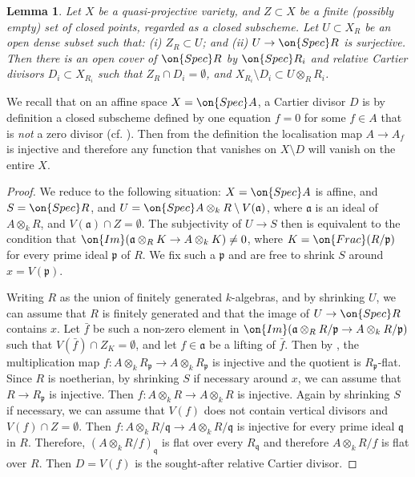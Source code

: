 \documentclass[]{pcmi}
\theoremstyle{plain}
\newtheorem{lem}[equation]{Lemma}
\theoremstyle{remark}
\theoremstyle{definition}
\newcommand{\fraka}{{\mathfrak a}}
\newcommand{\frakp}{{\mathfrak p}}
\newcommand{\frakq}{{\mathfrak q}}
\newcommand{\Spec}{\on{Spec}}
\begin{document}
\begin{lem}\label{very dense vs Cartier}
Let $X$ be a quasi-projective variety, and $Z\subset X$ be a finite (possibly empty) set of closed points, regarded as a closed subscheme.
Let $U\subset X_R$ be an open dense subset such that: (i) $Z_R\subset U$; and (ii) $U\to \Spec R$ is surjective. Then there is an open cover of $\Spec R$ by $\Spec R_i$ and relative Cartier divisors $D_i\subset X_{R_i}$ such that $Z_R\cap D_i=\emptyset$, and $X_{R_i}\setminus D_i\subset U\otimes_RR_i$. 
\end{lem}
We recall that on an affine space $X=\Spec A$, a Cartier divisor $D$ is by definition a closed subscheme defined by one equation $f=0$ for some $f\in A$ that is \emph{not} a zero divisor (cf. \cite[Tag01WQ]{St}). Then from the definition the localisation map $A\to A_f$ is injective and therefore any function that vanishes on $X\setminus D$ will vanish on the entire $X$.
\begin{proof}We reduce to the following situation: $X=\Spec A$ is affine, and $S=\Spec R$,  and $U=\Spec A\otimes_k R\setminus V(\fraka)$, where $\fraka$ is an ideal of $A\otimes_k R$, and $V(\fraka)\cap Z=\emptyset$. 
The subjectivity of $U\to S$ then is equivalent to the condition that $\on{Im}(\fraka\otimes_RK\to A\otimes_kK)\neq 0$, where $K=\on{Frac}(R/\frakp)$ for every prime ideal $\frakp$ of $R$. We fix such a $\frakp$ and are free to shrink $S$ around $x=V(\frakp)$.

Writing $R$ as the union of finitely generated $k$-algebras, and by shrinking $U$, we can assume that $R$ is finitely generated and that the image of $U\to \Spec R$ contains $x$.
Let $\bar{f}$ be such a non-zero element in $\on{Im}(\fraka\otimes_R R/\frakp\to A\otimes_k R/\frakp)$ such that $V(\bar{f})\cap Z_K=\emptyset$, and let $f\in \fraka$ be a lifting of $\bar f$. 
Then by \cite[Tag00ME]{St}, the multiplication map $f: A\otimes_k R_\frakp\to A\otimes_k R_\frakp$ is injective and the quotient is $R_\frakp$-flat. Since $R$ is noetherian, by shrinking $S$ if necessary around $x$, we can assume that $R\to R_\frakp$ is injective. Then $f:A\otimes_k R\to A\otimes_k R$ is injective. Again by shrinking $S$ if necessary, we can assume that $V(f)$ does not contain vertical divisors and $V(f)\cap Z=\emptyset$. Then $f: A\otimes_k R/\frakq\to A\otimes_k R/\frakq$ is injective for every prime ideal $\frakq$ in $R$. Therefore, $(A\otimes_k R/f)_\frakq$ is flat over every $R_\frakq$ and therefore $A\otimes_kR/f$ is flat over $R$. Then $D=V(f)$ 
is the sought-after relative Cartier divisor.
\end{proof}
\end{document}

